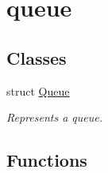 \hypertarget{group__queue}{}\section{queue}
\label{group__queue}
\subsection*{Classes}
\begin{DoxyCompactItemize}
\item 
struct \mbox{\hyperlink{struct_queue}{Queue}}
\begin{DoxyCompactList}\small\item\em Represents a queue. \end{DoxyCompactList}\end{DoxyCompactItemize}
\subsection*{Functions}
